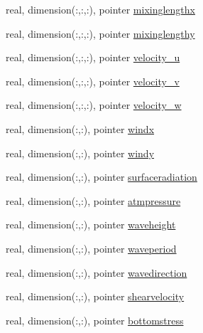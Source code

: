 \begin{DoxyCompactItemize}
\item 
real, dimension(\+:,\+:,\+:), pointer \mbox{\hyperlink{structmodulelagrangian_1_1t__externalvar_aad0b5095f77b1fe59dac9f9a10718596}{mixinglengthx}}
\item 
real, dimension(\+:,\+:,\+:), pointer \mbox{\hyperlink{structmodulelagrangian_1_1t__externalvar_a3dad80d9a45f7d32377b636438d190bb}{mixinglengthy}}
\item 
real, dimension(\+:,\+:,\+:), pointer \mbox{\hyperlink{structmodulelagrangian_1_1t__externalvar_ace9ea2c7d0d484fd2b5011056b2e1cc9}{velocity\+\_\+u}}
\item 
real, dimension(\+:,\+:,\+:), pointer \mbox{\hyperlink{structmodulelagrangian_1_1t__externalvar_a0d1e97b4c85275b8f159fb0a93ac9ac7}{velocity\+\_\+v}}
\item 
real, dimension(\+:,\+:,\+:), pointer \mbox{\hyperlink{structmodulelagrangian_1_1t__externalvar_a9832d529064b4a993cea66a0622e17b3}{velocity\+\_\+w}}
\item 
real, dimension(\+:,\+:), pointer \mbox{\hyperlink{structmodulelagrangian_1_1t__externalvar_a61d1e59d3dd344f7d4d10d0c89713e62}{windx}}
\item 
real, dimension(\+:,\+:), pointer \mbox{\hyperlink{structmodulelagrangian_1_1t__externalvar_a3a9b3ed9c2237e88443d9a1a2306543c}{windy}}
\item 
real, dimension(\+:,\+:), pointer \mbox{\hyperlink{structmodulelagrangian_1_1t__externalvar_abe337cea3f288d96c665da297690dc6b}{surfaceradiation}}
\item 
real, dimension(\+:,\+:), pointer \mbox{\hyperlink{structmodulelagrangian_1_1t__externalvar_a67aed9410eca1243792237d1f13de75d}{atmpressure}}
\item 
real, dimension(\+:,\+:), pointer \mbox{\hyperlink{structmodulelagrangian_1_1t__externalvar_a6b7e07649c3fd0bd959dd1389bd79465}{waveheight}}
\item 
real, dimension(\+:,\+:), pointer \mbox{\hyperlink{structmodulelagrangian_1_1t__externalvar_ac03b9aa14e3ee1cbba1b3a62c2a61d7b}{waveperiod}}
\item 
real, dimension(\+:,\+:), pointer \mbox{\hyperlink{structmodulelagrangian_1_1t__externalvar_a0986f50c6d38430ee4ebaa2b89319155}{wavedirection}}
\item 
real, dimension(\+:,\+:), pointer \mbox{\hyperlink{structmodulelagrangian_1_1t__externalvar_ae9d9844a7a5c3182293e2fd108b623fa}{shearvelocity}}
\item 
real, dimension(\+:,\+:), pointer \mbox{\hyperlink{structmodulelagrangian_1_1t__externalvar_ae550d36c64a506a79b2187d4709384b6}{bottomstress}}

\end{DoxyCompactItemize}
